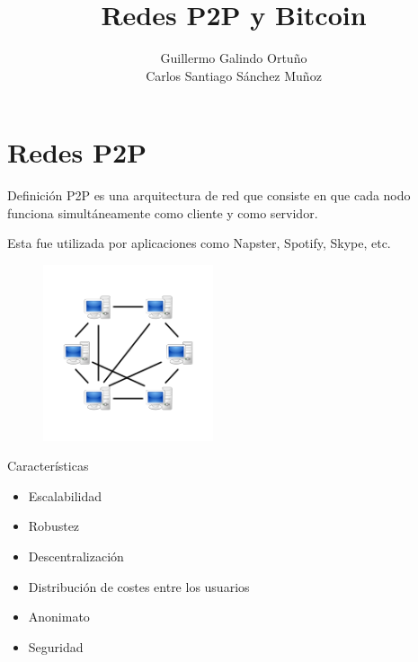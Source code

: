 \documentclass[compress,brown,xcolor=table]{beamer}
\title{Redes P2P y Bitcoin}
\author{Guillermo Galindo Ortuño \\ Carlos Santiago Sánchez Muñoz}
\institute{Fudamentos de Redes}
\date{}
\begin{document}

\frame{
	\titlepage 
}


\frame{\tableofcontents}

\section{Redes P2P}
\begin{frame}{Definición}
P2P es una arquitectura de red que consiste en que cada nodo funciona
simultáneamente como cliente y como servidor.

Esta fue utilizada por aplicaciones como Napster, Spotify, Skype, etc.
\begin{figure}
		\includegraphics[width=5cm]{../images/p2pexample.png}
		\centering		
		\label{p4}
	\end{figure}

\end{frame}

\begin{frame}{Características}
	\begin{itemize}
	\item Escalabilidad
	\item Robustez
	\item Descentralización
	\item Distribución  de costes entre  los usuarios
	\item Anonimato
	\item Seguridad
\end{itemize}
	
\end{frame}
\end{document}
